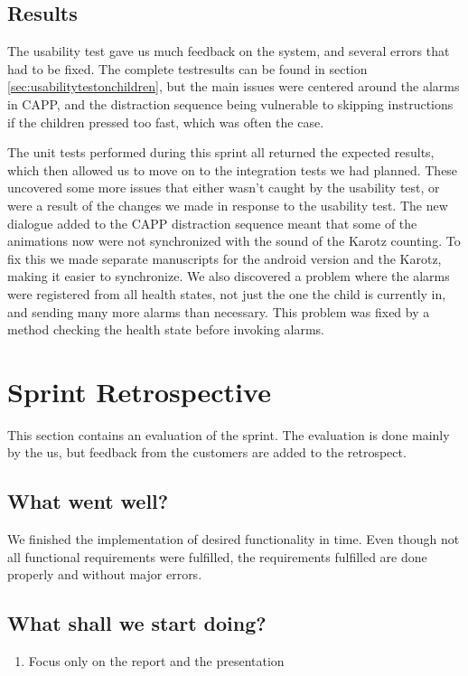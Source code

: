 \subsection{Results}
The usability test gave us much feedback on the system, and several errors that had to be fixed. The complete testresults can be found in section \ref{sec:usabilitytestonchildren}, but the main issues were centered around the alarms in CAPP, and the distraction sequence being vulnerable to skipping instructions if the children pressed too fast, 
which was often the case.

The unit tests performed during this sprint all returned the expected results, which then allowed us to move on to the integration tests we had planned. These uncovered some more 
issues that either wasn't caught by the usability test, or were a result of the changes we made in response to the usability test. The new dialogue added to the CAPP distraction sequence meant that some of the animations now were not synchronized with the sound of the Karotz counting. To fix this we made separate manuscripts for the android version and the Karotz, making it easier to synchronize.
We also discovered a problem where the alarms were registered from all health states, not just the one the child is currently in, and sending many more alarms than necessary. This problem was fixed by a method checking the health state before invoking alarms. 

\section{Sprint Retrospective}
This section contains an evaluation of the sprint. The evaluation is done mainly by the us, but feedback from the customers are added to the retrospect.

\label{sec:sprint5sprintRetrospective}

\subsection{What went well?}
We finished the implementation of desired functionality in time. Even though not all functional requirements were fulfilled, the requirements fulfilled are done properly and without major errors. 

\subsection{What shall we start doing?}
\begin{enumerate}
	\item Focus only on the report and the presentation
\end{enumerate}

